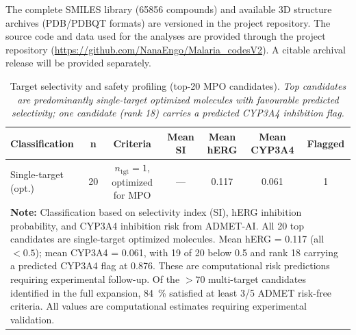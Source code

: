 \documentclass[journal=jcisd8,manuscript=suppinfo]{achemso}
\begin{document}
The complete SMILES library (\num{65856} compounds) and available 3D structure archives (PDB/PDBQT formats) are versioned in the project repository. The source code and data used for the analyses are provided through the project repository (\url{https://github.com/NanaEngo/Malaria_codesV2}). A citable archival release will be provided separately.

\begin{table}[!htbp]
\centering
\caption{Target selectivity and safety profiling (top-20 MPO candidates). \textit{Top candidates are predominantly single-target optimized molecules with favourable predicted selectivity; one candidate (rank \num{18}) carries a predicted CYP3A4 inhibition flag.}}
\label{tab:sm_s21_polypharm}
\scriptsize
\begin{tabular}{lcccccc}
\toprule
\textbf{Classification} & \textbf{n} & \textbf{Criteria} & \textbf{Mean SI} & \textbf{Mean hERG} & \textbf{Mean CYP3A4} & \textbf{Flagged} \\
\midrule
Single-target (opt.) & \num{20} & $n_{\text{tgt}} = \num{1}$, optimized for MPO & --- & \num{0.117} & \num{0.061} & \num{1} \\
\bottomrule
\multicolumn{7}{p{16cm}}{
\noindent\textbf{Note:} Classification based on selectivity index (SI), hERG inhibition probability,
and CYP3A4 inhibition risk from ADMET-AI. All \num{20} top candidates are single-target optimized molecules. Mean hERG = \num{0.117} (all $<\num{0.5}$); mean CYP3A4 = \num{0.061}, with \num{19} of \num{20} below \num{0.5} and rank \num{18} carrying a predicted CYP3A4 flag at \num{0.876}. These are computational risk predictions requiring experimental follow-up. Of the $>\num{70}$ multi-target candidates identified in the full
expansion, \qty{84}{\percent} satisfied at least \num{3}/\num{5} ADMET risk-free criteria.
All values are computational estimates requiring experimental validation.}
\end{tabular}
\end{table}
\end{document}
